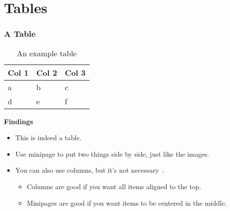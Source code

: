 \documentclass[
	11pt, %
	aspectratio=169, %
]{beamer}
\begin{document}
{
\begin{frame}[plain]
\end{frame}
}

\section{Tables}
\begin{frame}
  \frametitle{A Table}
  \centering
  \begin{minipage}{0.3\linewidth}
    \begin{table}
      \centering
      {\small
      \begin{tabular}[c]{lll}
      \toprule
      \textbf{Col 1} & \textbf{Col 2} & \textbf{Col 3} \\ \midrule
      a & b & c \\
      d & e & f \\
      \bottomrule
      \end{tabular}
      }
      \caption{An example table}
      \label{tab:}
    \end{table}
  \end{minipage}
  \begin{minipage}{0.6\linewidth}
    \textbf{Findings}\par
    \begin{itemize}
      \item This is indeed a table.
      \item Use minipage to put two things side by side, just like the images.
      \item You can also use columns, but it's not necessary~\cite{scharrerAnswerMinipageColumns2011}.
        \begin{itemize}
          \item Columns are good if you want all items aligned to the top.
          \item Minipages are good if you want items to be centered in the middle.
        \end{itemize}
    \end{itemize}
  \end{minipage}
\end{frame}
\end{document}
